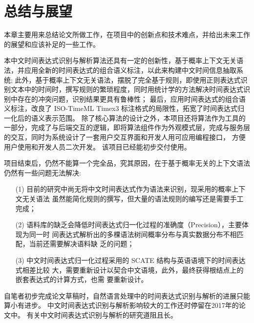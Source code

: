 
\chapter{总结与展望}

本章主要用来总结论文所做工作，在项目中的创新点和技术难点，并给出未来工作的展望和应该补足的一些工作。

本中文时间表达式识别与解析算法还具有一定的创新性，基于概率上下文无关语法，并应用全新的时间表达式的组合语义标注，以此来构建中文时间信息抽取系统;
此外，基于概率上下文无关语法，摆脱了完全基于规则，即使用正则表达式识别文本中的时间时，撰写规则的繁琐程度，同时用统计学的方法解决时间表达式识别中存在的冲突问题，识别结果更具有鲁棒性；
最后，应用时间表达式的组合语义标注，改良了 ISO-TimeML Timex3 标注格式的局限性，拓宽了时间表达式归一化后的语义表示范围。
除了核心算法的设计之外，本项目还将算法作为工具的一部分，完成了与后端交互的逻辑，即将算法组件作为外观模式层，完成与服务层的交互，同时为系统设计了一套用户交互界面和开发人用可应用编程接口，
方便用户使用和开发人员二次开发。 该项目已经能初步交付使用。

项目结束后，仍然不能算一个完全品，究其原因，在于基于概率无关的上下文语法仍然有一些问题无法解决:
\begin{enumerate}
    \item[(1)] 目前的研究中尚无将中文时间表达式作为语法来识别，现采用的概率上下文无关语法
    虽然能简化规则的撰写，但大量的语法规则的编写还是需要手工完成；
    \item[(2)] 语料库的缺乏会降低时间表达式归一化过程的准确度（Precision），主要体现为同一时
    间表达式解析出的多棵语法树间概率分布与真实数据分布不相匹配，当前还需要解决语料缺
    乏的问题；
    \item[(3)] 中文时间表达式归一化过程采用的 SCATE 结构与英语语境下的时间表达式相差比较
    大，需要重新设计以契合中文语境，此外，最终获得根结点上的嵌套表达式的计算方式，也需
    要重新设计。
\end{enumerate}

自笔者初步完成论文草稿时，自然语言处理中的时间表达式识别与解析的进展只能算小有进步。 
中文时间表达式识别与解析影响较大的工作还时停留在2017年的论文中。 有关中文时间表达式识别与解析的研究道阻且长。




